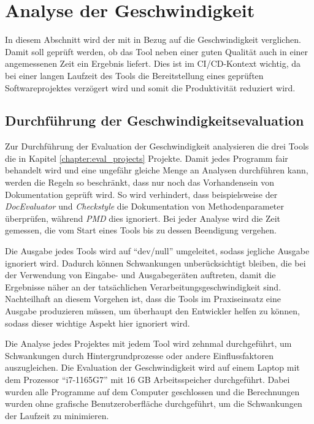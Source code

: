 \clearpage

 \section{Analyse der Geschwindigkeit}
 In diesem Abschnitt wird der \doceval mit \checkpmd in Bezug auf die Geschwindigkeit verglichen. Damit soll geprüft werden, ob das Tool neben einer guten Qualität auch in einer angemessenen Zeit ein Ergebnis liefert. Dies ist im \ac{CI/CD}-Kontext wichtig, da bei einer langen Laufzeit des Tools  die Bereitstellung eines geprüften Softwareprojektes verzögert wird und somit die Produktivität reduziert wird. 
 
 \subsection{Durchführung der Geschwindigkeitsevaluation}
 Zur Durchführung der Evaluation der Geschwindigkeit analysieren die drei Tools die in Kapitel \ref{chapter:eval_projects} Projekte. Damit jedes Programm fair behandelt wird und eine ungefähr gleiche Menge an Analysen durchführen kann, werden die Regeln so beschränkt, dass nur noch das Vorhandensein von Dokumentation geprüft wird. So wird verhindert, dass beispielsweise der \textit{DocEvaluator} und \textit{Checkstyle} die Dokumentation von Methodenparameter überprüfen, während \textit{PMD} dies ignoriert. Bei jeder Analyse wird die Zeit gemessen, die vom Start eines Tools bis zu dessen Beendigung vergehen. 
 
 Die Ausgabe jedes Tools wird auf \enquote{dev/null} umgeleitet, sodass jegliche Ausgabe ignoriert wird. Dadurch können Schwankungen unberücksichtigt bleiben, die bei der Verwendung von Eingabe- und Ausgabegeräten auftreten, damit die Ergebnisse näher an der tatsächlichen Verarbeitungsgeschwindigkeit sind.  Nachteilhaft an diesem Vorgehen ist, dass die Tools im Praxiseinsatz eine Ausgabe produzieren müssen, um überhaupt den Entwickler helfen zu können, sodass dieser wichtige Aspekt hier ignoriert wird. 
 
 Die Analyse jedes Projektes mit jedem Tool wird zehnmal durchgeführt, um Schwankungen durch Hintergrundprozesse oder andere Einflussfaktoren auszugleichen. Die Evaluation der Geschwindigkeit wird auf einem Laptop mit dem Prozessor \enquote{i7-1165G7} mit 16 GB Arbeitsspeicher durchgeführt. Dabei wurden alle Programme auf dem Computer geschlossen und die Berechnungen wurden ohne grafische Benutzeroberfläche durchgeführt, um die Schwankungen der Laufzeit zu minimieren.  
